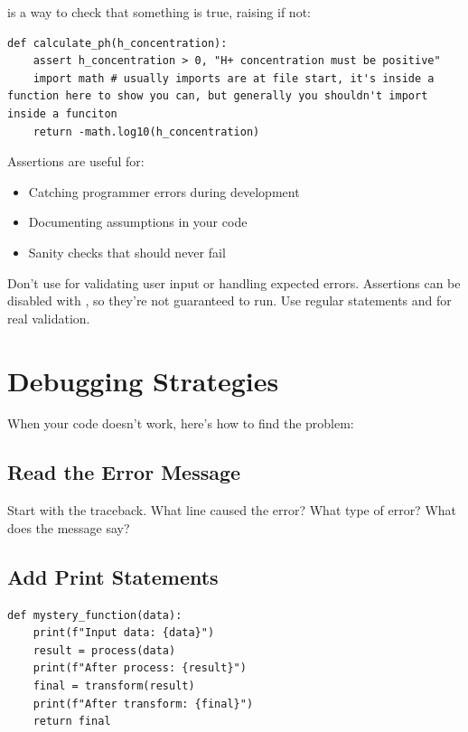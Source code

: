  is a way to check that something is true, raising  if not:

\begin{lstlisting}
def calculate_ph(h_concentration):
    assert h_concentration > 0, "H+ concentration must be positive"
    import math # usually imports are at file start, it's inside a function here to show you can, but generally you shouldn't import inside a funciton
    return -math.log10(h_concentration)
\end{lstlisting}

Assertions are useful for:
\begin{itemize}
    \item Catching programmer errors during development
    \item Documenting assumptions in your code
    \item Sanity checks that should never fail
\end{itemize}

\begin{warning}
Don't use  for validating user input or handling expected errors. Assertions can be disabled with , so they're not guaranteed to run. Use regular  statements and  for real validation.
\end{warning}

\section{Debugging Strategies}
\label{sec:debugging}

When your code doesn't work, here's how to find the problem:

\subsection{Read the Error Message}

Start with the traceback. What line caused the error? What type of error? What does the message say?

\subsection{Add Print Statements}

\begin{lstlisting}
def mystery_function(data):
    print(f"Input data: {data}")
    result = process(data)
    print(f"After process: {result}")
    final = transform(result)
    print(f"After transform: {final}")
    return final
\end{lstlisting}

